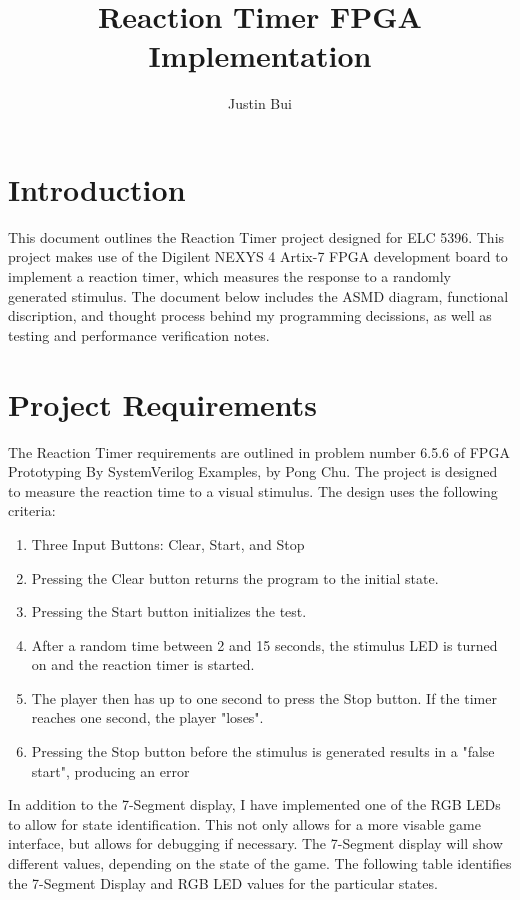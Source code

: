 \documentclass{article}
\author{Justin Bui}
\title{Reaction Timer FPGA Implementation}
\begin{document}
\maketitle
\newpage

\tableofcontents
\newpage

\section{Introduction}
This document outlines the Reaction Timer project designed for ELC 5396. This project makes use of the Digilent NEXYS 4 Artix-7 FPGA development board to implement a reaction timer, which measures the response to a randomly generated stimulus. The document below includes the ASMD diagram, functional discription, and thought process behind my programming decissions, as well as testing and performance verification notes. 

\section{Project Requirements}
The Reaction Timer requirements are outlined in problem number 6.5.6 of FPGA Prototyping By SystemVerilog Examples, by Pong Chu. The project is designed to measure the reaction time to a visual stimulus. The design uses the following criteria:

\begin{enumerate}
	\item Three Input Buttons: Clear, Start, and Stop
	\item Pressing the Clear button returns the program to the initial state.
	\item Pressing the Start button initializes the test.
	\item After a random time between 2 and 15 seconds, the stimulus LED is turned on and the reaction timer is started.
	\item The player then has up to one second to press the Stop button. If the timer reaches one second, the player "loses".
	\item Pressing the Stop button before the stimulus is generated results in a "false start", producing an error
\end{enumerate} 

In addition to the 7-Segment display, I have implemented one of the RGB LEDs to allow for state identification. This not only allows for a more visable game interface, but allows for debugging if necessary. The 7-Segment display will show different values, depending on the state of the game. The following table identifies the 7-Segment Display and RGB LED values for the particular states.
\end{document}

